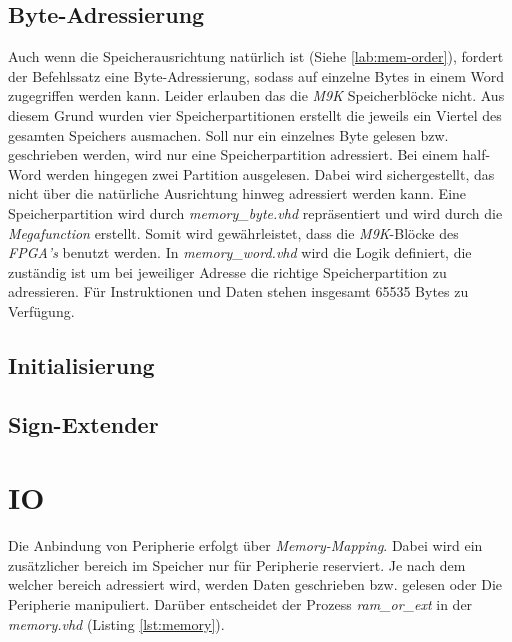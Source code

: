         
        \subsection{Byte-Adressierung}
            Auch wenn die Speicherausrichtung natürlich ist (Siehe \ref{lab:mem-order}), fordert der Befehlssatz eine Byte-Adressierung,
            sodass auf einzelne Bytes in einem Word zugegriffen werden kann. Leider erlauben das die \textit{M9K} Speicherblöcke nicht.
            Aus diesem Grund wurden vier Speicherpartitionen erstellt die jeweils ein Viertel des gesamten Speichers ausmachen.
            Soll nur ein einzelnes Byte gelesen bzw. geschrieben werden, wird nur eine Speicherpartition adressiert.
            Bei einem half-Word werden hingegen zwei Partition ausgelesen. Dabei wird sichergestellt,
            das nicht über die natürliche Ausrichtung hinweg adressiert werden kann.
            Eine Speicherpartition wird durch \textit{memory\_byte.vhd} repräsentiert und wird durch die \textit{Megafunction} erstellt.
            Somit wird gewährleistet, dass die \textit{M9K}-Blöcke des \textit{FPGA's} benutzt werden.
            In \textit{memory\_word.vhd} wird die Logik definiert, die zuständig ist um bei jeweiliger Adresse die 
            richtige Speicherpartition zu adressieren.
            Für Instruktionen und Daten stehen insgesamt 65535 Bytes zu Verfügung.

        \subsection{Initialisierung}
        \subsection{Sign-Extender}

        

    \section{IO}

        Die Anbindung von Peripherie erfolgt über \textit{Memory-Mapping}.
        Dabei wird ein zusätzlicher bereich im Speicher nur für Peripherie reserviert.
        Je nach dem welcher bereich adressiert wird, werden Daten geschrieben bzw. gelesen
        oder Die Peripherie manipuliert. Darüber entscheidet der Prozess \textit{ram\_or\_ext}
        in der \textit{memory.vhd} (Listing \ref{lst:memory}).

